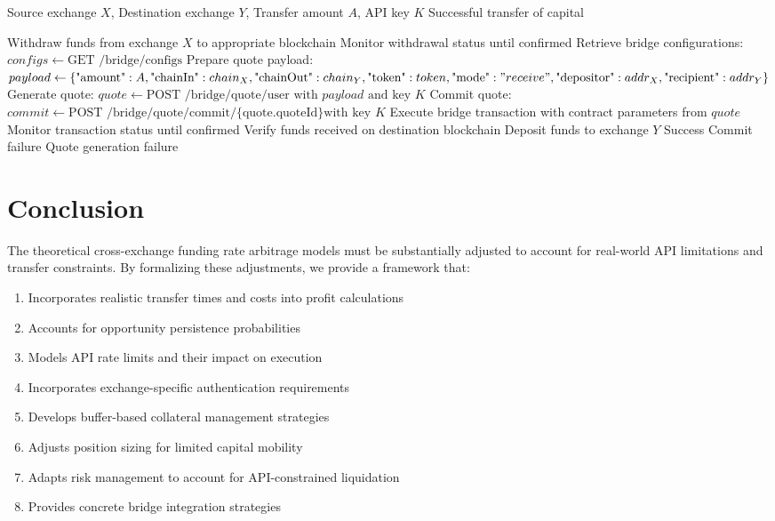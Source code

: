 \documentclass{article}
\begin{document}
\begin{algorithm}
\caption{Rhino.fi Bridge Capital Transfer}
\begin{algorithmic}[1]
\REQUIRE Source exchange $X$, Destination exchange $Y$, Transfer amount $A$, API key $K$
\ENSURE Successful transfer of capital

\STATE Withdraw funds from exchange $X$ to appropriate blockchain
\STATE Monitor withdrawal status until confirmed
\STATE Retrieve bridge configurations: $configs \gets \text{GET /bridge/configs}$
\STATE Prepare quote payload:
\STATE $payload \gets \{\text{"amount"}: A, \text{"chainIn"}: chain_X, \text{"chainOut"}: chain_Y, \text{"token"}: token, \text{"mode"}: "receive", \text{"depositor"}: addr_X, \text{"recipient"}: addr_Y\}$
\STATE Generate quote: $quote \gets \text{POST /bridge/quote/user with } payload \text{ and key } K$
    \STATE Commit quote: $commit \gets \text{POST /bridge/quote/commit/\{quote.quoteId\} with key } K$
        \STATE Execute bridge transaction with contract parameters from $quote$
        \STATE Monitor transaction status until confirmed
        \STATE Verify funds received on destination blockchain
        \STATE Deposit funds to exchange $Y$
        \RETURN Success
    \ELSE
        \RETURN Commit failure
    \ENDIF
\ELSE
    \RETURN Quote generation failure
\ENDIF
\end{algorithmic}
\end{algorithm}

\section{Conclusion}

The theoretical cross-exchange funding rate arbitrage models must be substantially adjusted to account for real-world API limitations and transfer constraints. By formalizing these adjustments, we provide a framework that:

\begin{enumerate}
    \item Incorporates realistic transfer times and costs into profit calculations
    \item Accounts for opportunity persistence probabilities
    \item Models API rate limits and their impact on execution
    \item Incorporates exchange-specific authentication requirements
    \item Develops buffer-based collateral management strategies
    \item Adjusts position sizing for limited capital mobility
    \item Adapts risk management to account for API-constrained liquidation
    \item Provides concrete bridge integration strategies
\end{enumerate}
\end{document}
